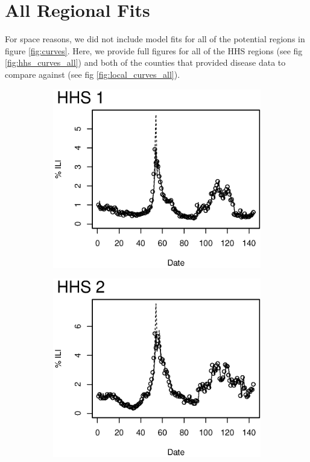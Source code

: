 \chapter{All Regional Fits}
\label{appendix:curvefits}

For space reasons, we did not include model fits for all of the potential regions in figure \ref{fig:curves}. Here, we provide full figures for all of the HHS regions (see fig \ref{fig:hhs_curves_all}) and both of the counties that provided disease data to compare against (see fig \ref{fig:local_curves_all}).

\begin{figure}
\centering
\begin{subfigure}[b]{0.49\textwidth}
	\includegraphics[width=\textwidth]{longitude/figs/nowcastHHS_1.eps}
\end{subfigure}
\begin{subfigure}[b]{0.49\textwidth}
	\includegraphics[width=\textwidth]{longitude/figs/nowcastHHS_2.eps}

\end{subfigure}
\end{figure}
